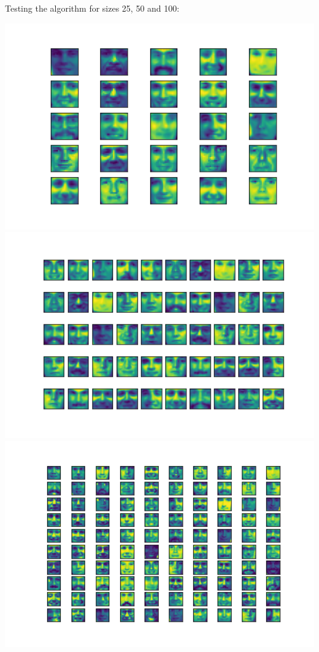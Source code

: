 Testing the algorithm for sizes 25, 50 and 100:
\begin{center}
\includegraphics[width=1\textwidth]{Ex_01/Figures/t1-4-k4.png} 
\quad
\includegraphics[width=1\textwidth]{Ex_01/Figures/t1-4-k9.png}
\quad
\includegraphics[width=1\textwidth]{Ex_01/Figures/t1-4-k16.png}
\end{center}







